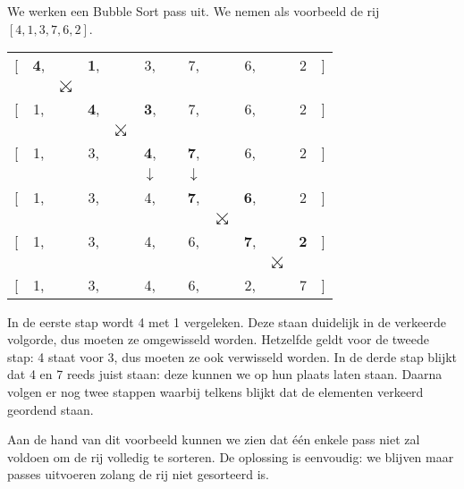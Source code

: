 \begin{example}
We werken een Bubble Sort pass uit. We nemen als voorbeeld de rij $[4,1,3,7,6,2]$.
{
\newcommand{\HL}[1]{\textbf{#1}}
\newcommand{\swap}{\ensuremath{\searrow\kern-10pt\swarrow}}
\newcommand{\keep}{\ensuremath{\downarrow}}
\begin{center}
  \begin{tabular}{rcccccccccccl}
    {[} & \HL4, && \HL1, && 3, && 7, && 6, && 2 & ] \\
    && \swap && \phantom{\swap} && \phantom{\swap} && \phantom{\swap} && \phantom{\swap} \\
    {[} & 1, && \HL4, && \HL3, && 7, && 6, && 2 & ] \\
    &&&& \swap \\
    {[} & 1, && 3, && \HL4, && \HL7, && 6, && 2 & ] \\
    &&&&& \keep && \keep \\
    {[} & 1, && 3, && 4, && \HL7, && \HL6, && 2 & ] \\
    &&&&&&&& \swap \\
    {[} & 1, && 3, && 4, && 6, && \HL7, && \HL2 & ] \\
    &&&&&&&&&& \swap \\
    {[} & 1, && 3, && 4, && 6, && 2, && 7 & ] \\
  \end{tabular}
\end{center}
}
In de eerste stap wordt 4 met 1 vergeleken. Deze staan duidelijk in de verkeerde
volgorde, dus moeten ze omgewisseld worden. Hetzelfde geldt voor de tweede stap:
4 staat voor 3, dus moeten ze ook verwisseld worden. In de derde stap blijkt
dat 4 en 7 reeds juist staan: deze kunnen we op hun plaats laten staan.
Daarna volgen er nog twee stappen waarbij telkens blijkt dat de elementen
verkeerd geordend staan.
\end{example}

Aan de hand van dit voorbeeld kunnen we zien dat \'e\'en enkele pass niet zal voldoen
om de rij volledig te sorteren. De oplossing is eenvoudig: we blijven maar passes
uitvoeren zolang de rij niet gesorteerd is.

